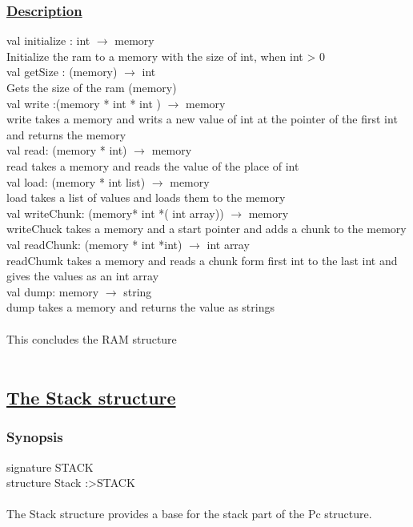 \documentclass[a4paper]{article}
\begin{document}
\subsubsection{\uline{Description}}

val initialize : int $\rightarrow$ memory \\	
	Initialize the ram to a memory with the size of int, when int > 0
\\
val getSize : (memory) $\rightarrow$ int\\
		Gets the size of the ram (memory) 
\\
val write :(memory * int * int ) $\rightarrow$ memory\\
		write takes a memory and writs a new value of int at the pointer of the first int and returns the memory
\\
val read: (memory * int) $\rightarrow$ memory\\
		read takes a memory and reads the value of the place of int
\\
val load: (memory * int list) $\rightarrow$ memory\\
		load takes a list of values and loads them to the memory
\\
val writeChunk: (memory* int *( int array)) $\rightarrow$ memory \\
		writeChuck takes a memory and a start pointer and adds a chunk to the memory
\\
val readChunk: (memory * int *int) $\rightarrow$ int array \\
		readChumk takes a memory and reads a chunk form first int to the last int and gives the values as an int array
\\
val dump: memory $\rightarrow$ string\\
		dump takes a memory and returns the value as strings
\\
\\
This concludes the RAM structure
\\
\\
\subsection{\uline{The Stack structure}}
\subsubsection{Synopsis}

signature STACK \\
structure Stack :\textgreater STACK
\\
\\
The Stack structure provides a base for the stack part of the Pc structure.
\end{document}
